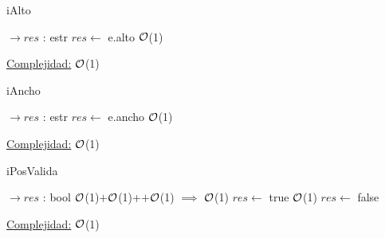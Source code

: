 \begin{Representacion}
\begin{Algoritmos}
\begin{algorithm}[H]
	\end{algorithm}
	
	\begin{algorithm}[H]
		\caption{iAlto}
		
		\begin{algorithmic}[1]
			 $\to res$ : estr
			\State $res \leftarrow$ e.alto \Comment $\mathcal{O}$(1)
			\EndProcedure
		\end{algorithmic}
		\underline{Complejidad:} $\mathcal{O}$(1)
		
	\end{algorithm}
	
	\begin{algorithm}[H]
		\caption{iAncho}
		
		\begin{algorithmic}[1]
			 $\to res$ : estr
			\State $res \leftarrow$ e.ancho \Comment $\mathcal{O}$(1)
			\EndProcedure
		\end{algorithmic}
		\underline{Complejidad:} $\mathcal{O}$(1)
		
	\end{algorithm}
	
	\begin{algorithm}[H]
		\caption{iPosValida}
		
		\begin{algorithmic}[1]
			 $\to res$ : bool
			 \Comment $\mathcal{O}$(1)$+$$\mathcal{O}$(1)+$+$$\mathcal{O}$(1) $\implies$ $\mathcal{O}$(1)
				\State $res \leftarrow$ true
			\Else	\Comment $\mathcal{O}$(1)
				\State $res \leftarrow$ false
				\EndIf
			\EndProcedure
		\end{algorithmic}
		\underline{Complejidad:} $\mathcal{O}$(1)
		
	\end{algorithm}
	
\end{Algoritmos}
\end{Representacion}